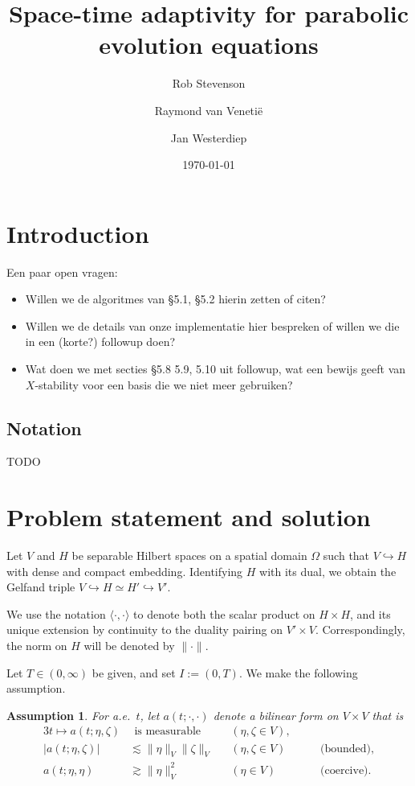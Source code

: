 \documentclass[11pt,a4paper,oneside,english]{amsart}
\title{Space-time adaptivity for parabolic evolution equations}
\author{Rob Stevenson \and Raymond van Veneti\"e \and Jan Westerdiep}
\date{\today}
\numberwithin{equation}{section}
\numberwithin{theorem}{section}
\newtheorem{assum}[theorem]{Assumption}
\theoremstyle{definition}
\newcommand{\la}{\langle}
\newcommand{\ra}{\rangle}
\begin{document}
\begin{abstract}
\end{abstract}

\maketitle

\section{Introduction}
Een paar open vragen:
\begin{itemize}
  \item Willen we de algoritmes van \S 5.1, \S 5.2 hierin zetten of citen?
  \item Willen we de details van onze implementatie hier bespreken of willen we die in een (korte?) followup doen?
  \item Wat doen we met secties \S 5.8 5.9, 5.10 uit followup, wat een bewijs geeft van $X$-stability voor een basis die we niet meer gebruiken?

\end{itemize}
\subsection{Notation}
TODO
\section{Problem statement and solution}
Let $V$ and $H$ be separable Hilbert spaces on a spatial domain $\Omega$ such that
$V \hookrightarrow H$ with dense and compact embedding. Identifying $H$ with its
dual, we obtain the Gelfand triple $V \hookrightarrow H \simeq H' \hookrightarrow V'$.

We use the notation $\la \cdot,\cdot \ra$ to denote both the scalar product
on $H \times H$, and its unique extension by continuity to the duality pairing on
$V' \times V$. Correspondingly, the norm on $H$ will be denoted by $\|\cdot\|$.

Let $T \in (0, \infty)$ be given, and set $I := (0, T)$. We make the following assumption.
\begin{assum}
  \label{assum:a}
  For a.e.~$t$, let $a(t;\cdot,\cdot)$ denote a bilinear form on $V \times V$ that is
  \begin{alignat*}{3}
    t \mapsto a(t; \eta, \zeta) & ~~ \text{is measurable} \quad && (\eta, \zeta \in V), \\
    |a(t;\eta,\zeta)| & \lesssim  \|\eta\|_{V} \|\zeta\|_{V} &&(\eta,\zeta \in V) &\quad&\text{(bounded)}, \\
     a(t;\eta,\eta)   & \gtrsim   \|\eta\|_{V}^2 &&(\eta \in {V}) &&\text{(coercive)}.
  \end{alignat*}
\end{assum}
\end{document}
